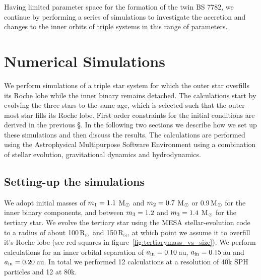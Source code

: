 \documentclass[twocolumn]{aastex62}
\newcommand{\RSun}{\mbox{R$_\odot$}}
\begin{document}
Having limited parameter space for the formation of the twin BS 7782, we continue by performing a series of simulations to
investigate the accretion and changes to the inner orbits of triple
systems in this range of parameters.

\section{Numerical Simulations} \label{sims}

We perform simulations of a triple star system for which the outer
star overfills its Roche lobe while the inner binary remains
detached. The calculations start by evolving the three stars to the
same age, which is selected such that the outer-most star fills its
Roche lobe.  First order constraints for the initial conditions are
derived in the previous \S. In the following two sections we describe
how we set up these simulations and then discuss the results. The
calculations are performed using the Astrophysical Multipurpose
Software Environment using a combination of stellar evolution,
gravitational dynamics and hydrodynamics.

\subsection{Setting-up the simulations}

We adopt initial masses of $m_{\rm 1} = 1.1$ M$_{\rm \odot}$ and
$m_{\rm 2} = 0.7$ M$_{\rm \odot}$ or 0.9\,M$_{\rm \odot}$ for the
inner binary components, and between $m_{\rm 3} = 1.2$ and $m_{\rm 3}
= 1.4$ M$_{\rm \odot}$ for the tertiary star.  We evolve the tertiary
star using the MESA stellar-evolution code \cite{2011ApJS..192....3P}
to a radius of about 100\,\RSun\, and 150\,\RSun, at which point we
assume it to overfill it's Roche lobe (see red squares in
figure~\ref{fig:tertiarymass_vs_size}).  We perform calculations for
an inner orbital separation of $a_{\rm in} = 0.10$\,au, $a_{\rm in} =
0.15$\,au and $a_{\rm in} = 0.20$\,au.  In total we performed 12
calculations at a resolution of 40k SPH particles and 12 at 80k.
\end{document}
